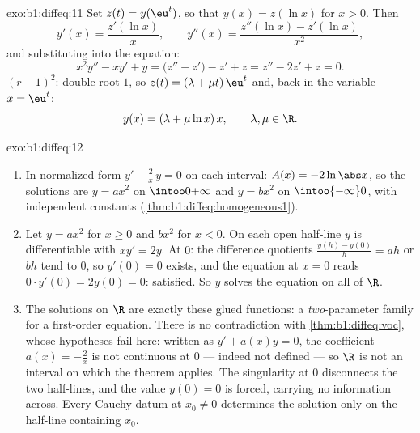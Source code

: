 \begin{solution}{exo:b1:diffeq:11}
Set $z(t) = y(\eu^t)$, so that $y(x) = z(\ln x)$ for $x > 0$. Then
\[
y'(x) = \frac{z'(\ln x)}x,
\qquad
y''(x) = \frac{z''(\ln x) - z'(\ln x)}{x^2} ,
\]
and substituting into the equation:
\[
x^2y'' - xy' + y = \bigl(z'' - z'\bigr) - z' + z
= z'' - 2z' + z = 0 .
\]
 $(r - 1)^2$: double root $1$, so $z(t) =
(\lambda + \mu t)\,\eu^t$ and, back in the variable $x = \eu^t$:
\[
y(x) = (\lambda + \mu\ln x)\,x,
\qquad \lambda, \mu \in \R .
\]
\end{solution}

\begin{solution}{exo:b1:diffeq:12}
\begin{enumerate}
  \item In normalized form $y' - \frac2x\,y = 0$ on each interval:
        $A(x) = -2\ln\abs x$, so the solutions are $y = a x^2$ on
        $\intoo0{+\infty}$ and $y = b x^2$ on $\intoo{-\infty}0$,
        with independent constants
        (\cref{thm:b1:diffeq:homogeneous1}).
  \item Let $y = ax^2$ for $x \geq 0$ and $bx^2$ for $x < 0$. On
        each open half-line $y$ is differentiable with $xy' = 2y$.
        At $0$: the difference quotients $\frac{y(h) - y(0)}h =
        ah$ or $bh$ tend to $0$, so $y'(0) = 0$ exists, and the
        equation at $x = 0$ reads $0 \cdot y'(0) = 2y(0) = 0$:
        satisfied. So $y$ solves the equation on all of $\R$.
  \item The solutions on $\R$ are exactly these glued functions: a
        \emph{two}-parameter family for a first-order equation.
        There is no contradiction with \cref{thm:b1:diffeq:voc},
        whose hypotheses fail here: written as $y' + a(x)y = 0$,
        the coefficient $a(x) = -\frac2x$ is not continuous at $0$
        --- indeed not defined --- so $\R$ is not an interval on
        which the theorem applies. The singularity at $0$
        disconnects the two half-lines, and the value $y(0) = 0$
        is forced, carrying no information across. Every Cauchy
        datum at $x_0 \neq 0$ determines the solution only on the
        half-line containing $x_0$.
\end{enumerate}
\end{solution}

